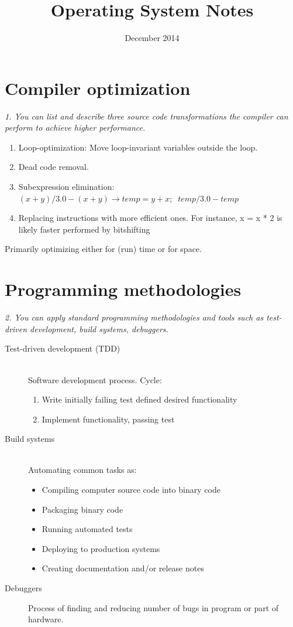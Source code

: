 \documentclass{article}
\title{Operating System Notes}
\author{December 2014}
\date{}
\begin{document}
\maketitle
\tableofcontents
\pagebreak

\setcounter{page}{1}

\section{Compiler optimization}
\emph{1. You can list and describe three source code transformations the compiler can perform to achieve higher performance.}

\begin{enumerate}
	\item Loop-optimization: Move loop-invariant variables outside the loop.
	\item Dead code removal.
	\item Subexpression elimination: $(x + y) / 3.0 - (x + y)\rightarrow temp = y+x;\;\; temp/3.0-temp$
	\item Replacing instructions with more efficient ones. For instance, x = x * 2 is likely faster performed by bitshifting
\end{enumerate}

Primarily optimizing either for (run) time or for space.


\section{Programming methodologies}
\emph{2. You can apply standard programming methodologies and tools such as test-driven development, build systems, debuggers.}

\begin{description}
\item[Test-driven development (TDD)] \ \\
Software development process. Cycle:
\begin{enumerate}
\item Write initially failing test defined desired functionality
\item Implement functionality, passing test
\end{enumerate}

\item[Build systems] \ \\
Automating common tasks as:
\begin{itemize}
\item Compiling computer source code into binary code
\item Packaging binary code
\item Running automated tests
\item Deploying to production systems
\item Creating documentation and/or release notes
\end{itemize}

\item[Debuggers] Process of finding and reducing number of bugs in program or part of hardware.
\end{description}
\end{document}
